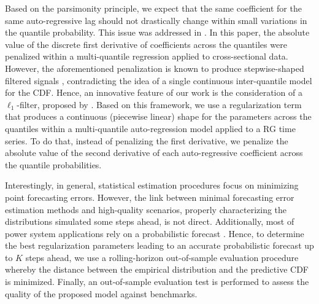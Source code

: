 Based on the parsimonity principle, we expect that the same coefficient for the same auto-regressive lag should not drastically change within small variations in the quantile probability. This issue was addressed in \cite{jiang_interquantile_2014}. In this paper, the absolute value of the discrete first derivative of coefficients across the quantiles were penalized within a multi-quantile regression applied to cross-sectional data. However, the aforementioned penalization is known to produce stepwise-shaped filtered signals \cite{kim2009ell_1}, contradicting the idea of a single continuous inter-quantile model for the CDF. Hence, an innovative feature of our work is the consideration of a $\ell_1$-filter, proposed by \cite{kim2009ell_1}. Based on this framework, we use a regularization term that produces a continuous (piecewise linear) shape for the parameters across the quantiles within a multi-quantile auto-regression model applied to a RG time series. To do that, instead of penalizing the first derivative, we penalize the absolute value of the second derivative of each auto-regressive coefficient across the quantile probabilities. %

Interestingly, in general, statistical estimation procedures focus on minimizing point forecasting errors. However, the link between minimal forecasting error estimation methods and high-quality scenarios, properly characterizing the distributions simulated some steps ahead, is not direct. Additionally, most of power system applications rely on a probabilistic forecast \cite{pinson_probabilistic_2009,papa2015,Aderson2017,Fanzeres2015,gallego2016line}. Hence, to determine the best regularization parameters leading to an accurate probabilistic forecast up to $K$ steps ahead, we use a rolling-horizon out-of-sample evaluation procedure whereby the distance between the empirical distribution and the predictive CDF is minimized. Finally, an out-of-sample evaluation test is performed to assess the quality of the proposed model against benchmarks. 
 
